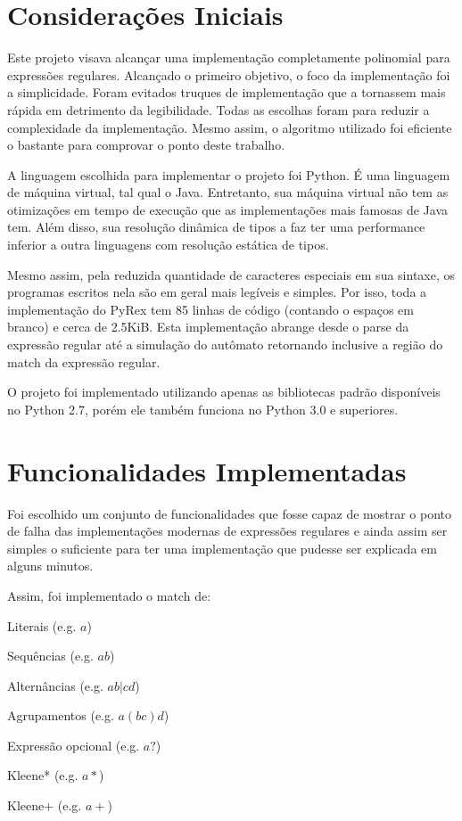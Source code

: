 \documentclass[a4paper,12pt,oneside,onecolumn]{uerj}
\begin{document}
\section{Considerações Iniciais}

Este projeto visava alcançar uma implementação completamente polinomial para expressões regulares. Alcançado o primeiro objetivo, o foco da implementação foi a simplicidade. Foram evitados truques de implementação que a tornassem mais rápida em detrimento da legibilidade. Todas as escolhas foram para reduzir a complexidade da implementação. Mesmo assim, o algoritmo utilizado foi eficiente o bastante para comprovar o ponto deste trabalho.

A linguagem escolhida para implementar o projeto foi Python. É uma linguagem de máquina virtual, tal qual o Java. Entretanto, sua máquina virtual não tem as otimizações em tempo de execução que as implementações mais famosas de Java tem. Além disso, sua resolução dinâmica de tipos a faz ter uma performance inferior a outra linguagens com resolução estática de tipos. 

Mesmo assim, pela reduzida quantidade de caracteres especiais em sua sintaxe, os programas escritos nela são em geral mais legíveis e simples. Por isso, toda a implementação do PyRex tem 85 linhas de código (contando o espaços em branco) e cerca de 2.5KiB. Esta implementação abrange desde o parse da expressão regular até a simulação do autômato retornando inclusive a região do match da expressão regular.

O projeto foi implementado utilizando apenas as bibliotecas padrão disponíveis no Python 2.7, porém ele também funciona no Python 3.0 e superiores.

\section{Funcionalidades Implementadas}

Foi escolhido um conjunto de funcionalidades que fosse capaz de mostrar o ponto de falha das implementações modernas de expressões regulares e ainda assim ser simples o suficiente para ter uma implementação que pudesse ser explicada em alguns minutos.

Assim, foi implementado o match de:

\begin{lcircp}
    \item Literais (e.g. $a$)
    \item Sequências (e.g. $ab$)
    \item Alternâncias (e.g. $ab|cd$)
    \item Agrupamentos (e.g. $a(bc)d$)
    \item Expressão opcional (e.g. $a?$)
    \item Kleene* (e.g. $a*$)
    \item Kleene+ (e.g. $a+$)
\end{lcircp}
\end{document}
